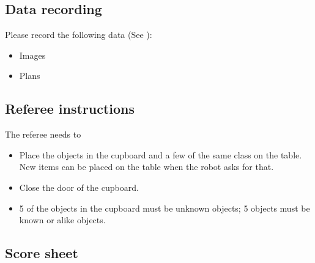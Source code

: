 \subsection{Data recording}
  Please record the following data (See ):
  \begin{itemize}
   \item Images
   \item Plans
  \end{itemize}

\subsection{Referee instructions}

The referee needs to
\begin{itemize}
\item Place the objects in the cupboard and a few of the same class on the table. New items can be placed on the table when the robot asks for that. 
\item Close the door of the cupboard. 
\item 5 of the objects in the cupboard must be unknown objects; 5 objects must be known or alike objects. 
\end{itemize}

\subsection{Score sheet}


